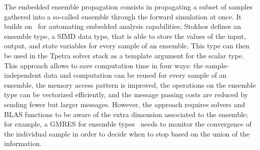 The embedded ensemble propagation consists in propagating a subset of samples gathered into a so-called ensemble through the forward simulation at once.
It builds on~\cite{pawlowski2012automating} for automating embedded analysis capabilities; Stokhos defines an ensemble type, a SIMD data type, that is able to store
the values of the input, output, and state variables for every sample of an ensemble. This type can then be used in the Tpetra solver stack as a template argument for the scalar type.
This approach allows to save computation time in four ways: the sample-independent data and computation can be reused for every sample of an ensemble, the memory access pattern is improved,
the operations on the ensemble type can be vectorized efficiently, and the message passing costs are reduced by sending fewer but larger messages.
However, the approach requires solvers and BLAS functions to be aware of the extra dimension associated to the ensemble; for example, a GMRES for ensemble types~\cite{liegeois2020gmres} needs to monitor 
the convergence of the individual sample in order to decide when to stop based on the union of the information.

